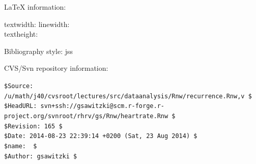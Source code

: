 \documentclass[a4paper, english, utf8]{amsart}
\begin{document}
\LaTeX{} information:
{\tiny

\currentpage 
textwidth: \prntlen{\textwidth} \qquad 
linewidth:\prntlen{\linewidth}\\
textheight: \prntlen{\textheight}\\
}

Bibliography style: jss

CVS/Svn repository information:

{\tiny%
\noindent
\verb+$Source: /u/math/j40/cvsroot/lectures/src/dataanalysis/Rnw/recurrence.Rnw,v $+\\
\verb!$HeadURL: svn+ssh://gsawitzki@scm.r-forge.r-project.org/svnroot/rhrv/gs/Rnw/heartrate.Rnw $!\\
\verb+$Revision: 165 $+\\
\verb!$Date: 2014-08-23 22:39:14 +0200 (Sat, 23 Aug 2014) $!\\
\verb+$name:  $+\\
\verb+$Author: gsawitzki $+
}
\end{document}
